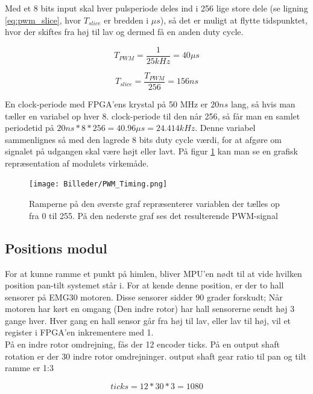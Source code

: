 Med et 8 bits input skal hver pulsperiode deles ind i 256 lige store dele (se ligning \ref{eq:pwm_slice}, hvor $T_{slice}$ er bredden i $\mu s$), så det er muligt at flytte tidspunktet, hvor der skiftes fra høj til lav og dermed få en anden duty cycle. 

\begin{equation}\label{eq:pwm_period}
T_{PWM}=\dfrac{1}{25 kHz} = 40 \mu s
\end{equation}

\begin{equation}\label{eq:pwm_slice}
T_{slice}=\dfrac{T_{PWM}}{256}=156ns
\end{equation}

En clock-periode med FPGA'ens krystal på 50 MHz er $20ns$ lang, så hvis man tæller en variabel op hver 8. clock-periode til den når 256, så får man en samlet periodetid på $20ns*8*256=40.96 \mu s=24.414kHz$. Denne variabel sammenlignes så med den lagrede 8 bits duty cycle værdi, for at afgøre om signalet på udgangen skal være højt eller lavt. På figur \ref{fig:PWM_timing} kan man se en grafisk repræsentation af modulets virkemåde.

\begin{figure}[ht]
	\begin{center}
		\texttt{[image: Billeder/PWM\_Timing.png]}
	\end{center}
\caption{Ramperne på den øverste graf repræsenterer variablen der tælles op fra 0 til 255. På den nederste graf ses det resulterende PWM-signal}
\label{fig:PWM_timing}
\end{figure}

\subsection{Positions modul}
For at kunne ramme et punkt på himlen, bliver MPU'en nødt til at vide hvilken position pan-tilt systemet står i.
For at kende denne position, er der to hall sensorer på EMG30 motoren.
Disse sensorer sidder 90 grader forskudt; Når motoren har kørt en omgang (Den indre rotor) har hall sensorerne sendt høj 3 gange hver.
Hver gang en hall sensor går fra høj til lav, eller lav til høj, vil et register i FPGA'en inkrementere med 1.\\

På en indre rotor omdrejning, fås der 12 encoder ticks.
På en output shaft rotation er der 30 indre rotor omdrejninger.
output shaft gear ratio til pan og tilt ramme er 1:3

\begin{equation}
ticks = 12*30*3 = 1080
\end{equation}

